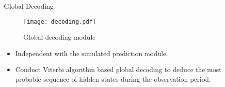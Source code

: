 \begin{frame}[fragile,t]{Global Decoding}
	\begin{figure}[!hbt]
    \center
    \texttt{[image: decoding.pdf]}
    \caption{Global decoding module}
    \label{fig:system:decoding}
    \end{figure}

    \begin{itemize}
    \item Independent with the simulated prediction module.
    \item Conduct Viterbi algorithm based global decoding to 
    	deduce the most probable sequence of hidden states during the observation period.
    \end{itemize}
\end{frame}
